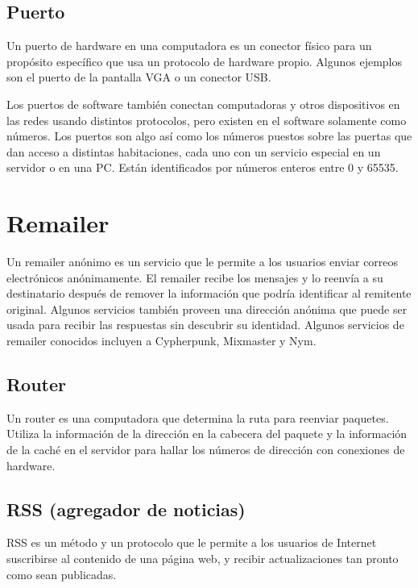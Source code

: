 \subsection{Puerto}\label{puerto}

Un puerto de hardware en una computadora es un conector físico para un
propósito específico que usa un protocolo de hardware propio. Algunos
ejemplos son el puerto de la pantalla VGA o un conector USB.

Los puertos de software también conectan computadoras y otros
dispositivos en las redes usando distintos protocolos, pero existen en
el software solamente como números. Los puertos son algo así como los
números puestos sobre las puertas que dan acceso a distintas
habitaciones, cada uno con un servicio especial en un servidor o en una
PC. Están identificados por números enteros entre 0 y 65535.

\section{Remailer}\label{remailer}

Un remailer anónimo es un servicio que le permite a los usuarios enviar
correos electrónicos anónimamente. El remailer recibe los mensajes y lo
reenvía a su destinatario después de remover la información que podría
identificar al remitente original. Algunos servicios también proveen una
dirección anónima que puede ser usada para recibir las respuestas sin
descubrir su identidad. Algunos servicios de remailer conocidos incluyen
a Cypherpunk, Mixmaster y Nym.

\subsection{Router}\label{router}

Un router es una computadora que determina la ruta para reenviar
paquetes. Utiliza la información de la dirección en la cabecera del
paquete y la información de la caché en el servidor para hallar los
números de dirección con conexiones de hardware.

\subsection{RSS (agregador de
noticias)}\label{rss-agregador-de-noticias}

RSS es un método y un protocolo que le permite a los usuarios de
Internet suscribirse al contenido de una página web, y recibir
actualizaciones tan pronto como sean publicadas.

